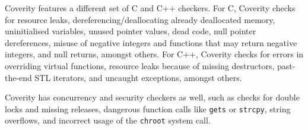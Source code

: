 Coverity features a different set of C and C++ checkers. For C, Coverity checks for resource leaks, dereferencing/deallocating already deallocated memory, uninitialised variables, unused pointer values, dead code, null pointer dereferences, misuse of negative integers and functions that may return negative integers, and null returns, amongst others. For C++, Coverity checks for errors in overriding virtual functions, resource leaks because of missing destructors, past-the-end STL iterators, and uncaught exceptions, amongst others.

Coverity has concurrency and security checkers as well, such as checks for double locks and missing releases, dangerous function calls like \texttt{gets} or \texttt{strcpy}, string overflows, and incorrect usage of the \texttt{chroot} system call.~\cite{emanuelsson2008comparative}